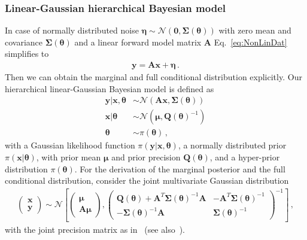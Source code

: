 \subsubsection{Linear-Gaussian hierarchical Bayesian model}
\label{subsec:LinBay}
In case of normally distributed noise $\bm{\eta} \sim \mathcal{N}(\bm{0},\bm{\Sigma}(\bm{\theta}))$ with zero mean and covariance $\bm{\Sigma}(\bm{\theta})$ and a linear forward model matrix $\bm{A}$ Eq.~\ref{eq:NonLinDat} simplifies to
\begin{align}
	\bm{y} = \bm{A} \bm{x} + \bm{\eta} \, .
	\label{eq:LinDat}
\end{align}
Then we can obtain the marginal and full conditional distribution explicitly.
Our hierarchical linear-Gaussian Bayesian model is defined as
\begin{subequations}
	\label{eq:GenBayMode}
	\begin{align}
		\bm{y} |  \bm{x}, \bm{\theta} &\sim \mathcal{N}(\bm{A} \bm{x}, \bm{\Sigma}(\bm{\theta}) ) \\
		\bm{x} |  \bm{\theta} &\sim \mathcal{N}(\bm{\mu}, \bm{Q}(\bm{\theta})^{-1} ) \\
		\bm{\theta} &\sim \pi(\bm{\theta}) \,  ,
	\end{align}
\end{subequations}
with a Gaussian likelihood function $\pi(\bm{y} | \bm{x}, \bm{\theta} )$, a normally distributed prior $\pi(\bm{x}|\bm{\theta})$, with prior mean $\bm{\mu}$ and prior precision $\bm{Q}(\bm{\theta})$, and a hyper-prior distribution $\pi(\bm{\theta})$.
For the derivation of the marginal posterior and the full conditional distribution, consider the joint multivariate Gaussian distribution
\begin{align}
	\begin{pmatrix}
		\bm{x} \\
		\bm{y}
	\end{pmatrix}\sim \mathcal{N}\left[  \begin{pmatrix}
		\bm{\mu} \\
		\bm{A}\bm{\mu}
	\end{pmatrix},\begin{pmatrix}
		\bm{Q}(\bm{\theta}) + \bm{A}^T \bm{\Sigma}(\bm{\theta})^{-1} \bm{A} & - \bm{A}^T \bm{\Sigma}(\bm{\theta})^{-1} \\
		-\bm{\Sigma}(\bm{\theta})^{-1} \bm{A} & \bm{\Sigma}(\bm{\theta})^{-1} 
	\end{pmatrix}^{-1} \right] \, , 	\label{eq:jointMultiGaus}
\end{align}
with the joint precision matrix as in~\cite{SIMPSON201216} (see also~\cite{rue2005gaussian, fox2016fast}).
